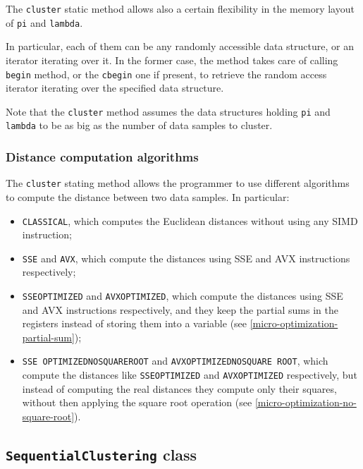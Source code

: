 \documentclass{article}
\begin{document}
The \texttt{cluster} static method allows also a certain flexibility in the memory layout of
\texttt{pi} and \texttt{lambda}.

In particular, each of them can be any randomly accessible data structure, or an iterator
iterating over it.
In the former case, the method takes care of calling \texttt{begin} method, or the
\texttt{cbegin} one if present, to retrieve the random access iterator iterating over the
specified data structure.

Note that the \texttt{cluster} method assumes the data structures holding \texttt{pi} and
\texttt{lambda} to be as big as the number of data samples to cluster.

\hypertarget{distance-computation-algorithms}{
    \subsubsection{Distance computation algorithms}
    \label{distance-computation-algorithms}}

The \texttt{cluster} stating method allows the programmer to use different algorithms to compute
the distance between two data samples. In particular:
\begin{itemize}
    \item \texttt{CLASSICAL}, which computes the Euclidean distances without using any SIMD
    instruction;
    \item \texttt{SSE} and \texttt{AVX}, which compute the distances using SSE and AVX
    instructions respectively;
    \item \texttt{SSE\textunderscore OPTIMIZED} and \texttt{AVX\textunderscore OPTIMIZED}, which
    compute the distances using
    SSE and AVX instructions respectively, and they keep the partial sums in the registers
    instead of storing them into a variable (see
    \ref{micro-optimization-partial-sum});
    \item \texttt{SSE\textunderscore
    OPTIMIZED\textunderscore NO\textunderscore SQUARE\textunderscore ROOT} and
    \texttt{AVX\textunderscore OPTIMIZED\textunderscore NO\textunderscore SQUARE\textunderscore
    ROOT}, which compute the distances like \texttt{SSE\textunderscore OPTIMIZED} and
    \texttt{AVX\textunderscore OPTIMIZED}
    respectively, but instead of computing the real distances they compute only their squares,
    without then applying the square root operation (see \ref{micro-optimization-no-square-root}).
\end{itemize}

\hypertarget{sequential-clustering}{
    \subsection{\texttt{SequentialClustering} class}
    \label{sequential-clustering}}
\end{document}

